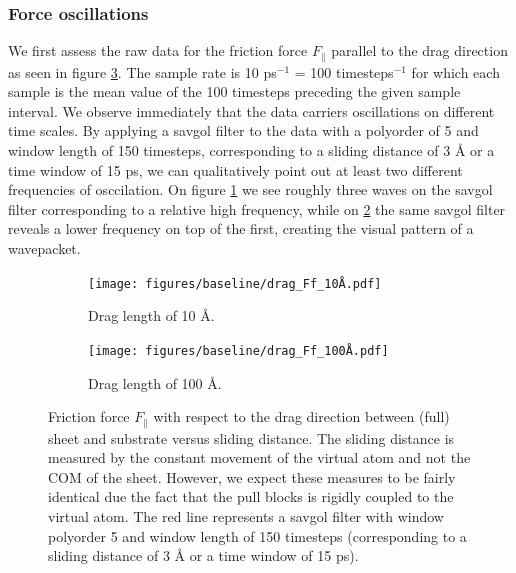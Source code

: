 \subsubsection{Force oscillations}\label{sec:force_oscillations}
We first assess the raw data for the friction force $F_{\parallel}$ parallel to the drag direction as seen in figure \ref{fig:drag_Ff}. The sample rate is 10 ps$^{-1}$ = 100 timesteps$^{-1}$ for which each sample is the mean value of the 100 timesteps preceding the given sample interval. We observe immediately that the data carriers oscillations on different time scales. By applying a savgol filter to the data with a polyorder of 5 and window length of 150 timesteps, corresponding to a sliding distance of 3 Å or a time window of 15 ps, we can qualitatively point out at least two different frequencies of osccilation. On figure \ref{fig:drag_Ff_10} we see roughly three waves on the savgol filter corresponding to a relative high frequency, while on \ref{fig:drag_Ff_100} the same savgol filter reveals a lower frequency on top of the first, creating the visual pattern of a wavepacket.

\begin{figure}[H]
  \centering
  \begin{subfigure}[t]{0.49\textwidth}
      \centering
      \texttt{[image: figures/baseline/drag\_Ff\_10Å.pdf]}
      \caption{Drag length of 10 Å.}
      \label{fig:drag_Ff_10}
  \end{subfigure}
  \hfill
  \begin{subfigure}[t]{0.49\textwidth}
      \centering
      \texttt{[image: figures/baseline/drag\_Ff\_100Å.pdf]}
      \caption{Drag length of 100 Å.}
      \label{fig:drag_Ff_100}
  \end{subfigure}
  \hfill
     \caption{Friction force $F_\parallel$ with respect to the drag direction between (full) sheet and substrate versus sliding distance. The sliding distance is measured by the constant movement of the virtual atom and not the COM of the sheet. However, we expect these measures to be fairly identical due the fact that the pull blocks is rigidly coupled to the virtual atom. The red line represents a savgol filter with window polyorder 5 and window length of 150 timesteps (corresponding to a sliding distance of 3 Å or a time window of 15 ps).}
     \label{fig:drag_Ff}
\end{figure}


